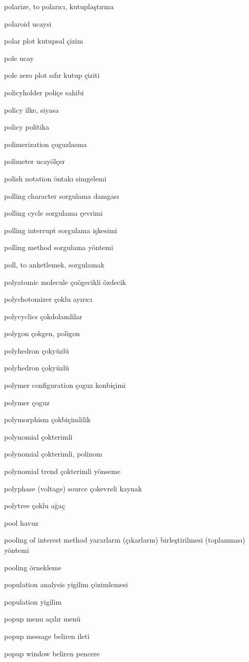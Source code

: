\documentclass[12pt,fleqn]{article}\usepackage{../../common}
\begin{document}
polarize, to polarıcı, kutuplaştırma

polaroid ucaysi

polar plot kutupsal çizim

pole ucay

pole zero plot sıfır kutup çiziti

policyholder poliçe sahibi

policy ilke, siyasa

policy politika

polimerization çoguzlasma

polimeter ucayölçer

polish notation öntakı simgelemi

polling character sorgulama damgası

polling cycle sorgulama çevrimi

polling interrupt sorgulama işkesimi

polling method sorgulama yöntemi

poll, to anketlemek, sorgulamak

polyatomic molecule çoögecikli özdecik

polychotomizer çoklu ayırıcı

polycyclics çokdolamlilar

polygon çokgen, poligon

polyhedron çokyüzlü

polyhedron çokyüzlü

polymer configuration çoguz konbiçimi

polymer çoguz

polymorphism çokbiçimlilik

polynomial çokterimli

polynomial çokterimli, polinom

polynomial trend çokterimli yönseme

polyphase (voltage) source çokevreli kaynak

polytree çoklu ağaç

pool havuz

pooling of interest method yararların (çıkarların) birleştirilmesi (toplanması) yöntemi

pooling örnekleme

population analysis yigilim çözimlemesi

population yigilim

popup menu açılır menü

popup message beliren ileti

popup window beliren pencere
\end{document}

